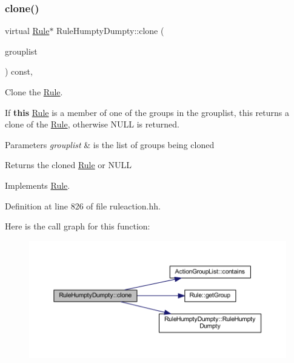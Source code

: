 \subsubsection{\texorpdfstring{clone()}{clone()}}
{\footnotesize\ttfamily virtual \mbox{\hyperlink{class_rule}{Rule}}$\ast$ Rule\+Humpty\+Dumpty\+::clone (\begin{DoxyParamCaption}\item[{const \mbox{\hyperlink{class_action_group_list}{Action\+Group\+List}} \&}]{grouplist }\end{DoxyParamCaption}) const\hspace{0.3cm}{\ttfamily [inline]}, {\ttfamily [virtual]}}



Clone the \mbox{\hyperlink{class_rule}{Rule}}. 

If {\bfseries{this}} \mbox{\hyperlink{class_rule}{Rule}} is a member of one of the groups in the grouplist, this returns a clone of the \mbox{\hyperlink{class_rule}{Rule}}, otherwise N\+U\+LL is returned. 
\begin{DoxyParams}{Parameters}
{\em grouplist} & is the list of groups being cloned \\
\hline
\end{DoxyParams}
\begin{DoxyReturn}{Returns}
the cloned \mbox{\hyperlink{class_rule}{Rule}} or N\+U\+LL 
\end{DoxyReturn}


Implements \mbox{\hyperlink{class_rule_a70de90a76461bfa7ea0b575ce3c11e4d}{Rule}}.



Definition at line 826 of file ruleaction.\+hh.

Here is the call graph for this function\+:
\nopagebreak
\begin{figure}[H]
\begin{center}
\leavevmode
\includegraphics[width=350pt]{class_rule_humpty_dumpty_a7fe5c55ca82d167ba7da46f2081e0c56_cgraph}
\end{center}
\end{figure}
\mbox{\label{class_rule_humpty_dumpty_a4893b92602fa296e01d9a782f633034a}} 
